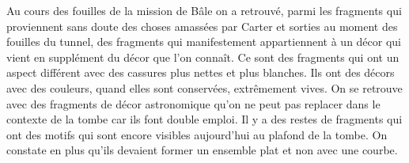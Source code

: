 \documentclass{article}
\begin{document}
Au cours des fouilles de la mission de Bâle on a retrouvé, parmi les
fragments qui proviennent sans doute des choses amassées par Carter et
sorties au moment des fouilles du tunnel, des fragments qui
manifestement appartiennent à un décor qui vient en supplément du décor
que l’on connaît. Ce sont des fragments qui ont un aspect différent
avec des cassures plus nettes et plus blanches. Ils ont des décors avec
des couleurs, quand elles sont conservées, extrêmement vives. On se
retrouve avec des fragments de décor astronomique qu’on ne peut pas
replacer dans le contexte de la tombe car ils font double emploi. Il y
a des restes de fragments qui ont des motifs qui sont encore visibles
aujourd’hui au plafond de la tombe. On constate en plus qu’ils devaient
former un ensemble plat et non avec une courbe.
\end{document}
